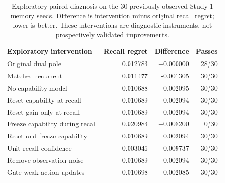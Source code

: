 \begin{table}[htbp]
\centering\small
\begin{tabular}{lrrr}
\toprule
Exploratory intervention & Recall regret & Difference & Passes \\
\midrule
Original dual pole & 0.012783 & +0.000000 & 28/30 \\
Matched recurrent & 0.011477 & -0.001305 & 30/30 \\
No capability model & 0.010688 & -0.002095 & 30/30 \\
Reset capability at recall & 0.010689 & -0.002094 & 30/30 \\
Reset gain only at recall & 0.010689 & -0.002094 & 30/30 \\
Freeze capability during recall & 0.020983 & +0.008200 & 0/30 \\
Reset and freeze capability & 0.010689 & -0.002094 & 30/30 \\
Unit recall confidence & 0.003046 & -0.009737 & 30/30 \\
Remove observation noise & 0.010689 & -0.002094 & 30/30 \\
Gate weak-action updates & 0.010698 & -0.002085 & 30/30 \\
\bottomrule
\end{tabular}
\caption{Exploratory paired diagnosis on the 30 previously observed Study 1 memory seeds. Difference is intervention minus original recall regret; lower is better. These interventions are diagnostic instruments, not prospectively validated improvements.}
\label{tab:study1-diagnosis}
\end{table}

